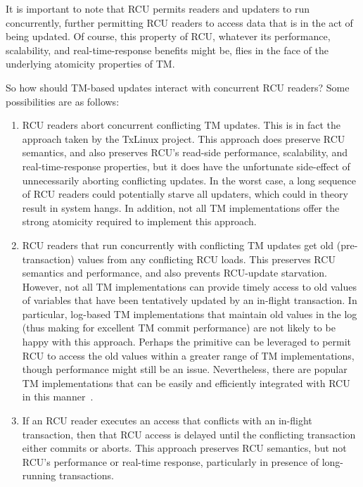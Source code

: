 It is important to note that RCU permits readers and updaters to run
concurrently, further permitting RCU readers to access data that is in
the act of being updated.
Of course, this property of RCU, whatever its performance, scalability,
and real-time-response benefits might be, flies in the face of the
underlying atomicity properties of TM.

So how should TM-based updates interact with concurrent RCU readers?
Some possibilities are as follows:

\begin{enumerate}
\item	RCU readers abort concurrent conflicting TM updates.
	This is in fact the approach taken by the TxLinux project.
	This approach does preserve RCU semantics, and also preserves
	RCU's read-side performance, scalability, and real-time-response
	properties, but it does have the unfortunate side-effect of
	unnecessarily aborting conflicting updates.
	In the worst case, a long sequence of RCU readers could
	potentially starve all updaters, which could in theory result
	in system hangs.
	In addition, not all TM implementations offer the strong atomicity
	required to implement this approach.
\item	RCU readers that run concurrently with conflicting TM updates
	get old (pre-transaction) values from any conflicting RCU loads.
	This preserves RCU semantics and performance, and also prevents
	RCU-update starvation.
	However, not all TM implementations can provide timely access
	to old values of variables that have been tentatively updated
	by an in-flight transaction.
	In particular, log-based TM implementations that maintain
	old values in the log (thus making for excellent TM commit
	performance) are not likely to be happy with this approach.
	Perhaps the  primitive can be leveraged
	to permit RCU to access the old values within a greater range
	of TM implementations, though performance might still be an issue.
	Nevertheless, there are popular TM implementations that can
	be easily and efficiently integrated with RCU in this
	manner~\cite{DonaldEPorter2007TRANSACT,PhilHoward2011RCUTMRBTree,
	PhilipWHoward2013RCUrbtree}.
\item	If an RCU reader executes an access that conflicts with an
	in-flight transaction, then that RCU access is delayed until
	the conflicting transaction either commits or aborts.
	This approach preserves RCU semantics, but not RCU's performance
	or real-time response, particularly in presence of long-running
	transactions.

\end{enumerate}
